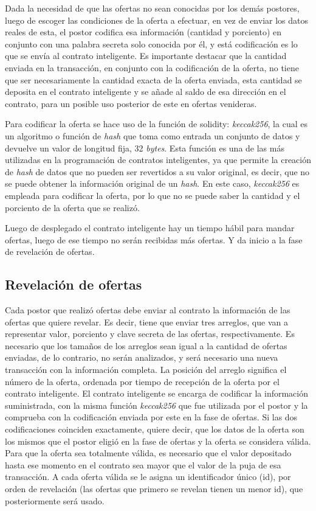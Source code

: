     Dada la necesidad de que las ofertas no sean conocidas por los demás postores, luego de escoger las 
    condiciones de la oferta a 
    efectuar, 
    en vez de enviar los datos reales de esta, el postor codifica esa información (cantidad y porciento) 
    en conjunto con una palabra secreta solo conocida por él, y está codificación es lo que se envía al 
    contrato inteligente. Es 
    importante destacar que la cantidad
    enviada en la transacción, en conjunto con la codificación de la oferta, no tiene que ser 
    necesariamente la cantidad exacta de la 
    oferta enviada, esta cantidad se deposita en el contrato inteligente y se añade al saldo de esa 
    dirección en el contrato, para un 
    posible uso posterior de este en ofertas venideras.

    Para codificar la oferta se hace uso de la función de solidity: \textit{keccak256}, la cual es un 
    algoritmo o función de \textit{hash} que toma como entrada un conjunto de datos y devuelve un valor de 
    longitud fija, 32 \textit{bytes}. Esta función es una de las más utilizadas en la programación de contratos 
    inteligentes, ya que permite la creación de \textit{hash} de datos que no pueden ser revertidos a su 
    valor original, es decir, que no se puede obtener la información original de un \textit{hash}. 
    En este caso, \textit{keccak256} es empleada para codificar la oferta, por lo que no se puede saber la 
    cantidad y el porciento de la oferta que se realizó.

    Luego de desplegado el contrato inteligente hay un tiempo hábil para mandar ofertas, luego de ese tiempo no serán recibidas más 
    ofertas. Y da inicio a la fase de revelación de ofertas.

    \subsection{Revelación de ofertas}
    Cada postor que realizó ofertas debe enviar al contrato la información de las ofertas que quiere revelar. Es decir, tiene que enviar
    tres arreglos, que van a representar valor, porciento y clave secreta de las ofertas, respectivamente. Es necesario que los tamaños
    de los arreglos sean igual a la cantidad de ofertas enviadas, de lo contrario, no serán analizados, y será necesario una nueva 
    transacción con la información completa. La posición del arreglo 
    significa el número de la oferta, ordenada por tiempo de recepción de la oferta por el contrato inteligente. El contrato inteligente 
    se encarga de codificar la información suministrada, con la misma función \textit{keccak256} que fue utilizada por el postor y la 
    comprueba con la codificación enviada por este en la fase de ofertas. Si las dos codificaciones coinciden exactamente, quiere decir, 
    que los datos de la oferta son los mismos que el postor eligió en la fase de ofertas y la oferta se considera válida. Para que la
    oferta sea totalmente válida, es necesario que el valor depositado hasta ese momento en el contrato sea mayor que el valor de la
    puja de esa transacción. A cada oferta válida se le asigna un identificador único (id), por orden de revelación (las ofertas que 
    primero se revelan tienen un menor id), que posteriormente será usado.

